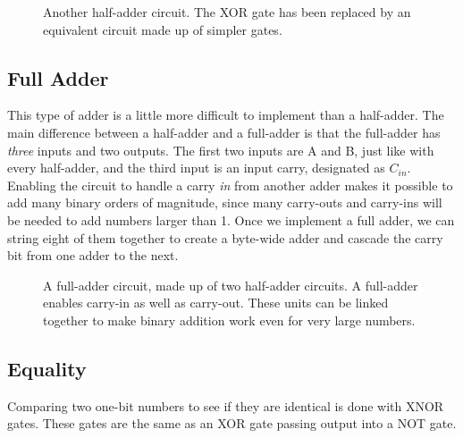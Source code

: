 \begin{figure}[h!]
\begin{center}



\caption{Another half-adder circuit. The XOR gate has been replaced by an equivalent circuit made up of simpler gates.}
\end{center}
\end{figure}


\subsection*{Full Adder}

This type of adder is a little more difficult to implement than a half-adder. The main difference between a half-adder and a full-adder is that the full-adder has \emph{three} inputs and two outputs. The first two inputs are A and B, just like with every half-adder, and the third input is an input carry, designated as $C_{in}$. Enabling the circuit to handle a carry \emph{in} from another adder makes it possible to add many binary orders of magnitude, since many carry-outs and carry-ins will be needed to add numbers larger than 1. Once we implement a full adder, we can string eight of them together to create a byte-wide adder and cascade the carry bit from one adder to the next.
\bigskip

\begin{figure}[h!]
\begin{center}

\caption{A full-adder circuit, made up of two half-adder circuits. A full-adder enables carry-in as well as carry-out. These units can be linked together to make binary addition work even for very large numbers.}
\end{center}
\end{figure}


\newpage

\subsection*{Equality}

Comparing two one-bit numbers to see if they are identical is done with XNOR gates. These gates are the same as an XOR gate passing output into a NOT gate. 

